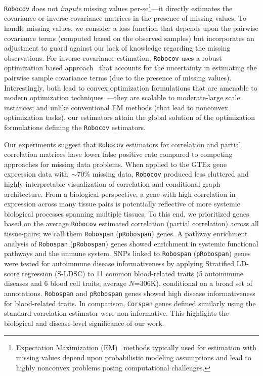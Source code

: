 \documentclass{bioinfo}
\def\Robocov{\texttt{Robocov}}
\def\Robospan{\texttt{Robospan}}
\def\pRobospan{\texttt{pRobospan}}
\def\Corspan{\texttt{Corspan}}
\begin{document}
\Robocov{} does not \emph{impute} missing values per-se\footnote{Expectation Maximization (EM)~\cite{Dempster1977} methods typically used for estimation with missing values depend upon probabilistic modeling assumptions and lead to highly nonconvex problems
posing computational challenges.}---it directly estimates the covariance or inverse covariance matrices in the presence of missing values. To handle missing values, we consider a loss function that depends upon the pairwise covariance terms (computed based on the observed samples) but incorporates an adjustment to guard against our lack of knowledge regarding the missing observations. For inverse covariance estimation, \Robocov{} uses a robust optimization based approach~\cite{ben2009robust,bertsimas2011theory} that accounts for the uncertainty in estimating the pairwise sample covariance terms (due to the presence of missing values). Interestingly, both lead to convex optimization formulations that are amenable to modern optimization techniques~\cite{BV2004}---they are scalable to moderate-large scale instances; and unlike conventional EM methods (that lead to nonconvex optimization tasks), our estimators attain the global solution of the optimization formulations defining the 
\Robocov{} estimators. 

Our experiments suggest that \Robocov{} estimators for correlation and partial correlation matrices have lower false positive rate compared to competing approaches for missing data problems.  When applied to the GTEx gene expression data with~$\sim70\%$ missing data, \Robocov{} produced less cluttered and highly interpretable visualization of correlation and conditional graph architecture. From a biological perspective, a gene with high correlation in expression across many tissue pairs is potentially reflective of more systemic biological processes spanning multiple tissues. To this end, we prioritized genes based on the average \Robocov{} estimated correlation (partial correlation) across all tissue-pairs; we call them  \Robospan{} (\pRobospan{}) genes. A pathway enrichment analysis of  \Robospan{} (\pRobospan{}) genes showed enrichment in systemic functional pathways and the immune system.  SNPs linked to \Robospan{} (\pRobospan{}) genes were tested for autoimmune disease informativeness by applying Stratified LD-score regression (S-LDSC) to 11 common blood-related traits (5 autoimmune diseases and 6 blood cell traits; average $N$=306K), conditional on a broad set of  annotations. \Robospan{} and \pRobospan{} genes showed high disease informativeness for blood-related traits. In comparison, \Corspan{} genes defined similarly using the standard correlation estimator were non-informative. This highlights the biological and disease-level significance of our work.
\end{document}
